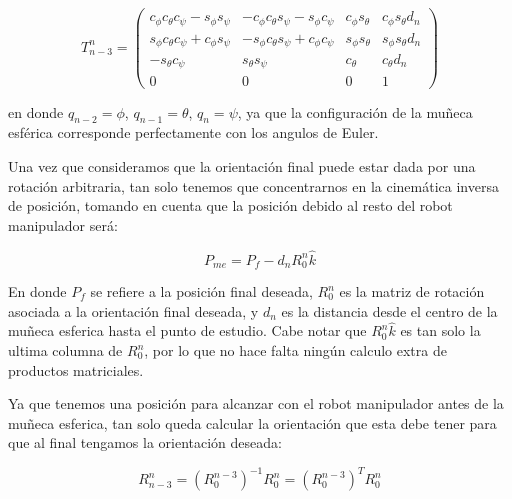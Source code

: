 \begin{multicols*}{3}
            \begin{equation}
                T_{n-3}^n =
                \begin{pmatrix}
                    c_{\phi} c_{\theta} c_{\psi} - s_{\phi} s_{\psi} & - c_{\phi} c_{\theta} s_{\psi} - s_{\phi} c_{\psi} & c_{\phi} s_{\theta} & c_{\phi} s_{\theta} d_n \\
                    s_{\phi} c_{\theta} c_{\psi} + c_{\phi} s_{\psi} & - s_{\phi} c_{\theta} s_{\psi} + c_{\phi} c_{\psi} & s_{\phi} s_{\theta} & s_{\phi} s_{\theta} d_n \\
                    - s_{\theta} c_{\psi} & s_{\theta} s_{\psi} & c_{\theta} & c_{\theta} d_n \\
                    0 & 0 & 0 & 1
                \end{pmatrix}
            \end{equation}

            en donde $q_{n-2} = \phi$, $q_{n-1} = \theta$, $q_{n} = \psi$, ya que la configuración de la muñeca esférica corresponde perfectamente con los angulos de Euler.

            Una vez que consideramos que la orientación final puede estar dada por una rotación arbitraria, tan solo tenemos que concentrarnos en la cinemática inversa de posición, tomando en cuenta que la posición debido al resto del robot manipulador será:

            \begin{equation}
                P_{me} = P_f - d_n R_0^n \hat{k}
            \end{equation}

            En donde $P_f$ se refiere a la posición final deseada, $R_0^n$ es la matriz de rotación asociada a la orientación final deseada, y $d_n$ es la distancia desde el centro de la muñeca esferica hasta el punto de estudio. Cabe notar que $R_0^n \hat{k}$ es tan solo la ultima columna de $R_0^n$, por lo que no hace falta ningún calculo extra de productos matriciales.

            Ya que tenemos una posición para alcanzar con el robot manipulador antes de la muñeca esferica, tan solo queda calcular la orientación que esta debe tener para que al final tengamos la orientación deseada:

            \begin{equation}
                R_{n-3}^n = \left( R_0^{n-3} \right)^{-1} R_0^n = \left( R_0^{n-3} \right)^T R_0^n
            \end{equation}


\end{multicols*}
